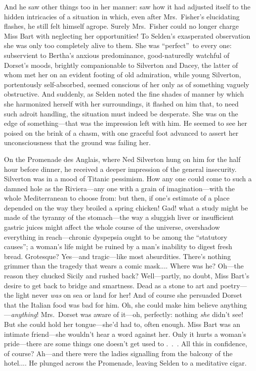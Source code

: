 \documentclass[12pt,a4paper]{book}
\begin{document}
And he saw other things too in her manner: saw how it had
adjusted itself to the hidden intricacies of a situation in
which, even after Mrs.\ Fisher's elucidating flashes, he still
felt himself agrope. Surely Mrs.\ Fisher could no longer charge
Miss Bart with neglecting her opportunities! To Selden's
exasperated observation she was only too completely alive to
them. She was ``perfect''\ to every one: subservient to Bertha's
anxious predominance, good-naturedly watchful of Dorset's moods,
brightly companionable to Silverton and Dacey, the latter of whom
met her on an evident footing of old admiration, while young
Silverton, portentously self-absorbed, seemed conscious of her
only as of something vaguely obstructive. And suddenly, as Selden
noted the fine shades of manner by which she harmonized herself
with her surroundings, it flashed on him that, to need such
adroit handling, the situation must indeed be desperate. She was
on the edge of something---that was the impression left with him. 
He seemed to see her poised on the brink of a chasm, with one
graceful foot advanced to assert her unconsciousness that
the ground was failing her.





On the Promenade des Anglais, where Ned Silverton hung on him for
the half hour before dinner, he received a deeper impression of
the general insecurity. Silverton was in a mood of Titanic
pessimism. How any one could come to such a damned hole as the
Riviera---any one with a grain of imagination---with the whole
Mediterranean to choose from: but then, if one's estimate of a
place depended on the way they broiled a spring chicken! Gad!
what a study might be made of the tyranny of the stomach---the way
a sluggish liver or insufficient gastric juices might affect the
whole course of the universe, overshadow everything in
reach---chronic dyspepsia ought to be among the ``statutory
causes''; a woman's life might be ruined by a man's inability to
digest fresh bread. Grotesque? Yes---and tragic---like most
absurdities. There's nothing grimmer than the tragedy that wears
a comic mask.... Where was he? Oh---the reason they chucked Sicily
and rushed back? Well---partly, no doubt, Miss Bart's desire to
get back to bridge and smartness. Dead as a stone to art and
poetry---the light never \textit{was} on sea or land for her! And of course
she persuaded Dorset that the Italian food was bad for him. Oh,
she could make him believe anything---\textit{anything}! Mrs.\ Dorset was
aware of it---oh, perfectly: nothing \textit{she} didn't see! But she could
hold her tongue---she'd had to, often enough. Miss Bart was an
intimate friend---she wouldn't hear a word against her. Only it
hurts a woman's pride---there are some things one doesn't get used
to .\ .\ . All this in confidence, of course? Ah---and there were
the ladies signalling from the balcony of the hotel.... He
plunged across the Promenade, leaving Selden to a meditative
cigar.
\end{document}
